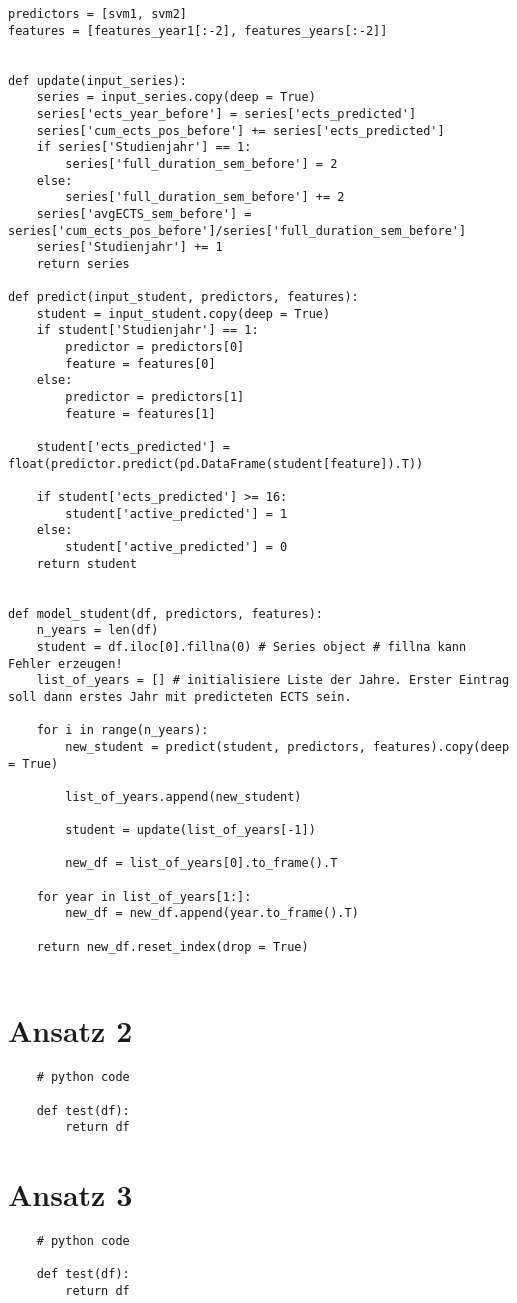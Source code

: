 \begin{lstlisting}
predictors = [svm1, svm2]
features = [features_year1[:-2], features_years[:-2]]


def update(input_series):
    series = input_series.copy(deep = True)
    series['ects_year_before'] = series['ects_predicted']
    series['cum_ects_pos_before'] += series['ects_predicted']
    if series['Studienjahr'] == 1:
        series['full_duration_sem_before'] = 2
    else:
        series['full_duration_sem_before'] += 2
    series['avgECTS_sem_before'] = series['cum_ects_pos_before']/series['full_duration_sem_before']
    series['Studienjahr'] += 1
    return series

def predict(input_student, predictors, features):
    student = input_student.copy(deep = True)
    if student['Studienjahr'] == 1:
        predictor = predictors[0]
        feature = features[0]
    else:
        predictor = predictors[1]
        feature = features[1]
    
    student['ects_predicted'] = float(predictor.predict(pd.DataFrame(student[feature]).T))
    
    if student['ects_predicted'] >= 16:
        student['active_predicted'] = 1
    else:
        student['active_predicted'] = 0
    return student


def model_student(df, predictors, features):
    n_years = len(df)
    student = df.iloc[0].fillna(0) # Series object # fillna kann Fehler erzeugen!
    list_of_years = [] # initialisiere Liste der Jahre. Erster Eintrag soll dann erstes Jahr mit predicteten ECTS sein.
    
    for i in range(n_years):
        new_student = predict(student, predictors, features).copy(deep = True)
        
        list_of_years.append(new_student)

        student = update(list_of_years[-1])
        
        new_df = list_of_years[0].to_frame().T
        
    for year in list_of_years[1:]:
        new_df = new_df.append(year.to_frame().T)
    
    return new_df.reset_index(drop = True)


\end{lstlisting}
\newpage




\section{Ansatz 2}
\begin{lstlisting}
    # python code 

    def test(df):
        return df
\end{lstlisting}
\newpage



\section{Ansatz 3}
\begin{lstlisting}
    # python code 

    def test(df):
        return df
\end{lstlisting}